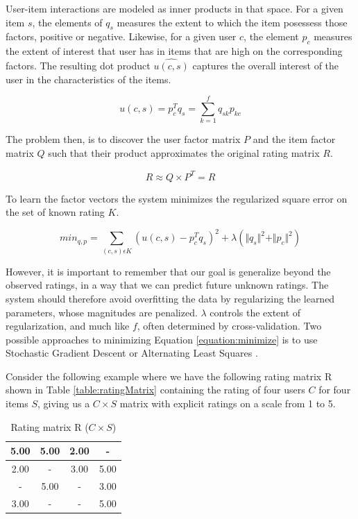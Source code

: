 User-item interactions are modeled as inner products in that space. For a given item $s$, the elements of $q_{s}$ measures the extent to which the item posessess those factors, positive or negative. Likewise, for a given user $c$, the element $p_{c}$ measures the extent of interest that user has in items that are high on the corresponding factors. The resulting dot product $\hat{u(c,s)}$ captures the overall interest of the user in the characteristics of the items.

\begin{equation}
u(c,s) = p_{c}^{T}q_{s} = \sum_{k=1}^{f} q_{sk}p_{kc}
\end{equation}

The problem then, is to discover the user factor matrix $P$ and the item factor matrix $Q$ such that their product approximates the original rating matrix $R$.

\begin{equation}
R \approx Q \times P^{T} = \hat{R}
\end{equation}

To learn the factor vectors the system minimizes the regularized square error on the set of known rating $K$.

\begin{equation}
\label{equation:minimize}
min_{q, p} = \sum_{(c,s)\epsilon K} (u(c,s) - p^{T}_{c}q_{s})^{2} + \lambda ( \Vert q_{s} \Vert ^{2} + \Vert p_{c} \Vert ^{2})
\end{equation}

However, it is important to remember that our goal is generalize beyond the observed ratings, in a way that we can predict future unknown ratings. The system should therefore avoid overfitting the data by regularizing the learned parameters, whose magnitudes are penalized. $\lambda$ controls the extent of regularization, and much like $f$, often determined by cross-validation. Two possible approaches to minimizing Equation \ref{equation:minimize} is to use Stochastic Gradient Descent or Alternating Least Squares \citep{Koren2009}.

Consider the following example where we have the following rating matrix R shown in Table \ref{table:ratingMatrix} containing the rating of four users $C$ for four items $S$, giving us a $C \times S$ matrix with explicit ratings on a scale from 1 to 5.

\begin{table}[!htbp]
\centering
\begin{tabular}{|c|c|c|c|}
\hline
5.00    & 5.00  & 2.00 & -    \\ \hline
2.00    & -     & 3.00 & 5.00 \\ \hline
 -      & 5.00  & -    & 3.00 \\ \hline
3.00    & -     & -    & 5.00 \\ \hline
\end{tabular}
\label{table:RatingMatrix}
\caption{Rating matrix R ($C \times S$)}
\end{table}

